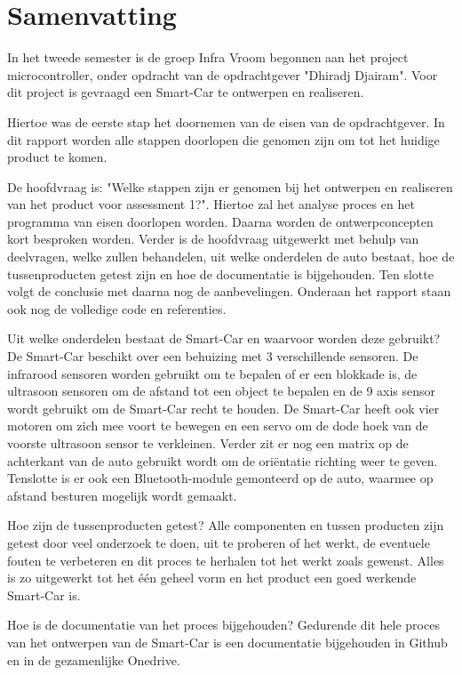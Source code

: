 \section*{Samenvatting}
In het tweede semester is de groep Infra Vroom begonnen aan het project microcontroller, onder opdracht van de opdrachtgever "Dhiradj Djairam". Voor dit project is gevraagd een \gls{Smart-Car} te ontwerpen en realiseren. 

Hiertoe was de eerste stap het doornemen van de eisen van de opdrachtgever. In dit rapport worden alle stappen doorlopen die genomen zijn om tot het huidige product te komen.  

De hoofdvraag is: "Welke stappen zijn er genomen bij het ontwerpen en realiseren van het product voor assessment 1?". Hiertoe zal het analyse proces en het programma van eisen doorlopen worden. Daarna worden de ontwerpconcepten kort besproken worden. Verder is de hoofdvraag uitgewerkt met behulp van deelvragen, welke zullen behandelen, uit welke onderdelen de auto bestaat, hoe de tussenproducten getest zijn en hoe de documentatie is bijgehouden. Ten slotte volgt de conclusie met daarna nog de aanbevelingen. Onderaan het rapport staan ook nog de volledige code en referenties.  

Uit welke onderdelen bestaat de \gls{Smart-Car} en waarvoor worden deze gebruikt?
De \gls{Smart-Car} beschikt over een behuizing met 3 verschillende sensoren. De infrarood sensoren worden gebruikt om te bepalen of er een blokkade is, de ultrasoon sensoren om de afstand tot een object te bepalen en de 9 axis sensor wordt gebruikt om de \gls{Smart-Car} recht te houden. De \gls{Smart-Car} heeft ook vier motoren om zich mee voort te bewegen en een servo om de dode hoek van de voorste ultrasoon sensor te verkleinen. Verder zit er nog een matrix op de achterkant van de auto gebruikt wordt om de oriëntatie richting weer te geven. Tenslotte is er ook een \gls{Bluetooth}-module gemonteerd op de auto, waarmee op afstand besturen mogelijk wordt gemaakt. 

Hoe zijn de tussenproducten getest?
Alle componenten en tussen producten zijn getest door veel onderzoek te doen, uit te proberen of het werkt, de eventuele fouten te verbeteren en dit proces te herhalen tot het werkt zoals gewenst. Alles is zo uitgewerkt tot het één geheel vorm en het product een goed werkende \gls{Smart-Car} is. 

Hoe is de documentatie van het proces bijgehouden?
 Gedurende dit hele proces van het ontwerpen van de \gls{Smart-Car} is een documentatie bijgehouden in Github en in de gezamenlijke Onedrive. 
